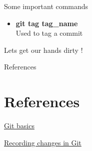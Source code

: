 \documentclass{beamer}
\begin{document}
\begin{frame}[allowframebreaks]{Some important commands}
\begin{adjustwidth}{-2em}{-2em}
\begin{itemize}
		\item {\textbf{git tag tag\_name} \\ Used to tag a commit}
	\end{itemize}
\end{adjustwidth}
\end{frame}	

\begin{frame}
	\begin{center}
		\Huge Lets get our hands dirty !
	\end{center}
\end{frame}

\begin{frame}{References}
  \section{References}
    
  \begin{thebibliography}{10}

	\href{https://git-scm.com/book/en/v2/Getting-Started-Git-Basics}{Git basics}
	
	\href{https://git-scm.com/book/en/v2/Git-Basics-Recording-Changes-to-the-Repository}{Recording changes in Git}
	
	

  \end{thebibliography}
\end{frame}
\end{document}
